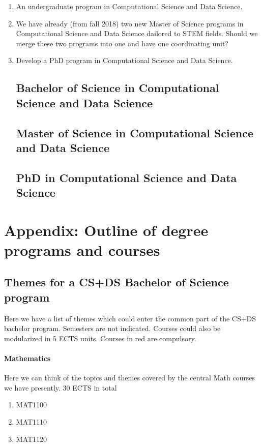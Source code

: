 \documentclass[oneside,final,10pt]{article}
\begin{document}
\begin{enumerate}
\item An undergraduate program in Computational Science and Data Science.

\item We have already (from fall 2018) two new Master of Science programs in Computational Science and Data Science dailored to STEM fields. Should we merge these two programs into one and have one coordinating unit? 

\item Develop a PhD program in Computational Science and Data Science.

\subsection*{Bachelor of Science in Computational Science and Data Science}

\subsection*{Master of Science in Computational Science and Data Science}

\subsection*{PhD in Computational Science and Data Science}


\end{enumerate}










\section*{Appendix:  Outline of degree programs and courses}

\subsection*{Themes for a CS+DS Bachelor of Science program}

Here we have a list of themes which could enter the common part of the CS+DS bachelor program.  
Semesters are not indicated. Courses could also be modularized in 5 ECTS units. Courses in red are compulsory.



\paragraph{Mathematics}
Here we can think of the topics and themes covered by the central  Math courses we have presently.
30 ECTS in total
\begin{enumerate}
\color{red}
    \item MAT1100
    \item MAT1110
    \item MAT1120
\end{enumerate}
\end{document}
